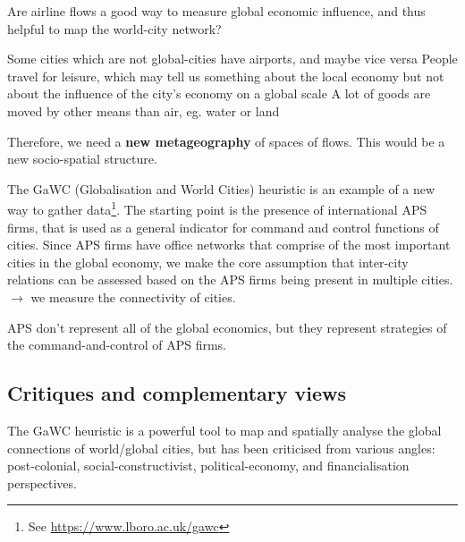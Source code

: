\documentclass{article}
\begin{document}
Are airline flows a good way to measure global economic influence, and thus helpful to map the world-city network?
\begin{outline}
	\1 Some cities which are not global-cities have airports, and maybe vice versa
	\1 People travel for leisure, which may tell us something about the local economy but not about the influence of the city's economy on a global scale
	\1 A lot of goods are moved by other means than air, eg. water or land
\end{outline}

Therefore, we need a \textbf{new metageography} of spaces of flows. This would be a new socio-spatial structure.

The GaWC (Globalisation and World Cities) heuristic is an example of a new way to gather data\footnote{See \url{https://www.lboro.ac.uk/gawc}}. The starting point is the presence of international APS firms, that is used as a general indicator for command and control functions of cities. Since APS firms have office networks that comprise of the most important cities in the global economy, we make the core assumption that inter-city relations can be assessed based on the APS firms being present in multiple cities. $\rightarrow$ we measure the connectivity of cities.

APS don't represent all of the global economics, but they represent strategies of the command-and-control of APS firms. 

\subsection{Critiques and complementary views}

The GaWC heuristic is a powerful tool to map and spatially analyse the global connections of world/global cities, but has been criticised from various angles: post-colonial, social-constructivist, political-economy, and financialisation perspectives.
\end{document}
